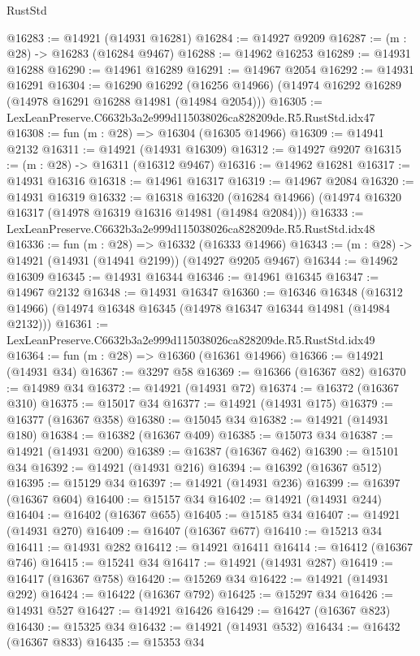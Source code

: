 \begin{lexlean}{RustStd}
\begin{coremodule}
@16283 := @14921 (@14931 @16281)
@16284 := @14927 @9209
@16287 := (m : @28) -> @16283 (@16284 @9467)
@16288 := @14962 @16253
@16289 := @14931 @16288
@16290 := @14961 @16289
@16291 := @14967 @2054
@16292 := @14931 @16291
@16304 := @16290
    @16292
    (@16256 @14966)
    (@14974 @16292 @16289 (@14978 @16291 @16288 @14981 (@14984 @2054)))
@16305 := LexLeanPreserve.C6632b3a2e999d115038026ca828209de.R5.RustStd.idx47
@16308 := fun (m : @28) => @16304 (@16305 @14966)
@16309 := @14941 @2132
@16311 := @14921 (@14931 @16309)
@16312 := @14927 @9207
@16315 := (m : @28) -> @16311 (@16312 @9467)
@16316 := @14962 @16281
@16317 := @14931 @16316
@16318 := @14961 @16317
@16319 := @14967 @2084
@16320 := @14931 @16319
@16332 := @16318
    @16320
    (@16284 @14966)
    (@14974 @16320 @16317 (@14978 @16319 @16316 @14981 (@14984 @2084)))
@16333 := LexLeanPreserve.C6632b3a2e999d115038026ca828209de.R5.RustStd.idx48
@16336 := fun (m : @28) => @16332 (@16333 @14966)
@16343 := (m : @28) -> @14921 (@14931 (@14941 @2199)) (@14927 @9205 @9467)
@16344 := @14962 @16309
@16345 := @14931 @16344
@16346 := @14961 @16345
@16347 := @14967 @2132
@16348 := @14931 @16347
@16360 := @16346
    @16348
    (@16312 @14966)
    (@14974 @16348 @16345 (@14978 @16347 @16344 @14981 (@14984 @2132)))
@16361 := LexLeanPreserve.C6632b3a2e999d115038026ca828209de.R5.RustStd.idx49
@16364 := fun (m : @28) => @16360 (@16361 @14966)
@16366 := @14921 (@14931 @34)
@16367 := @3297 @58
@16369 := @16366 (@16367 @82)
@16370 := @14989 @34
@16372 := @14921 (@14931 @72)
@16374 := @16372 (@16367 @310)
@16375 := @15017 @34
@16377 := @14921 (@14931 @175)
@16379 := @16377 (@16367 @358)
@16380 := @15045 @34
@16382 := @14921 (@14931 @180)
@16384 := @16382 (@16367 @409)
@16385 := @15073 @34
@16387 := @14921 (@14931 @200)
@16389 := @16387 (@16367 @462)
@16390 := @15101 @34
@16392 := @14921 (@14931 @216)
@16394 := @16392 (@16367 @512)
@16395 := @15129 @34
@16397 := @14921 (@14931 @236)
@16399 := @16397 (@16367 @604)
@16400 := @15157 @34
@16402 := @14921 (@14931 @244)
@16404 := @16402 (@16367 @655)
@16405 := @15185 @34
@16407 := @14921 (@14931 @270)
@16409 := @16407 (@16367 @677)
@16410 := @15213 @34
@16411 := @14931 @282
@16412 := @14921 @16411
@16414 := @16412 (@16367 @746)
@16415 := @15241 @34
@16417 := @14921 (@14931 @287)
@16419 := @16417 (@16367 @758)
@16420 := @15269 @34
@16422 := @14921 (@14931 @292)
@16424 := @16422 (@16367 @792)
@16425 := @15297 @34
@16426 := @14931 @527
@16427 := @14921 @16426
@16429 := @16427 (@16367 @823)
@16430 := @15325 @34
@16432 := @14921 (@14931 @532)
@16434 := @16432 (@16367 @833)
@16435 := @15353 @34

\end{coremodule}
\end{lexlean}
